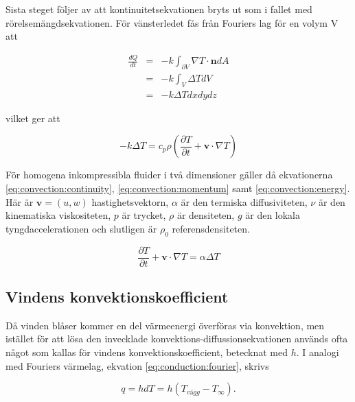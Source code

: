 Sista steget följer av att kontinuitetsekvationen bryts ut som i fallet med rörelsemängdsekvationen.
För vänsterledet fås från Fouriers lag för en volym V att

\begin{eqnarray}
\label{reynoldsenergytwo}
\frac{dQ}{dt} & = & -k \int_{\partial V} \nabla T \cdot \mathbf{n} dA \nonumber\\
& = & -k \int_V \Delta T dV \nonumber \\
& = & -k \Delta T dxdydz
\end{eqnarray}

vilket ger att

\begin{equation}
\label{reynoldsenergyalmost}
-k \Delta T = c_p \rho \left( \frac{\partial T}{\partial t} + \mathbf{v}\cdot \nabla T\right)
\end{equation}

För homogena inkompressibla fluider i två dimensioner gäller då ekvationerna
\eqref{eq:convection:continuity}, \eqref{eq:convection:momentum} samt \eqref{eq:convection:energy}. Här
är $\mathbf{v} = (u,w)$ hastighetsvektorn, $\alpha$ är den termiska
diffusiviteten, $\nu$ är den kinematiska viskositeten, $p$ är trycket,
$\rho$ är densiteten, $g$ är den lokala tyngdaccelerationen
och slutligen är $\rho_0$ referensdensiteten.


\begin{equation}\boxed{ \; \; \;
\label{eq:convection:energy}
\frac{\partial T}{\partial t} + \mathbf{v}\cdot\nabla T = \alpha\Delta T
\; \; \; }
\end{equation}

\subsection{Vindens konvektionskoefficient}

Då vinden blåser kommer en del värmeenergi överföras via konvektion, men istället för att lösa den invecklade konvektions-diffussionsekvationen används ofta något som kallas för vindens konvektionskoefficient, betecknat med $h$. I analogi med Fouriers värmelag, ekvation \ref{eq:conduction:fourier}, skrivs

\begin{equation}\boxed{ \; \; \;
q = hdT = h\left( T_{vägg} - T_{\infty}\right).
\; \; \;}\end{equation}


